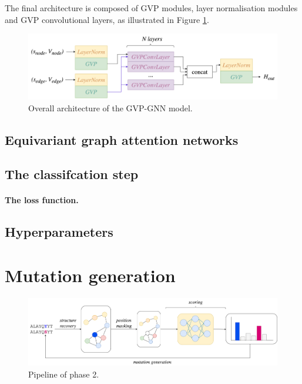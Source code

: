 The final architecture is composed of GVP modules, layer normalisation modules and GVP convolutional layers, as illustrated in Figure \ref{gvp-architecture}.
\begin{figure}
    \centering
    \includegraphics[width=\textwidth]{masters-report/figures/gvp_architecture_horizontal.png}
    \caption{Overall architecture of the GVP-GNN model.}
    \label{gvp-architecture}
\end{figure}

\subsection{Equivariant graph attention networks}

\subsection{The classifcation step}
\paragraph{The loss function.}
\subsection{Hyperparameters}

\section{Mutation generation}
\begin{figure}
    \centering
    \includegraphics[width=\textwidth]{masters-report/figures/mutation_generation_2.png}
    \caption{Pipeline of phase 2.}
    \label{mutation-generation}
\end{figure}

